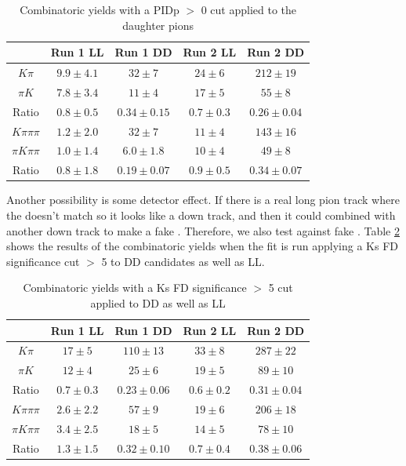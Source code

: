 \begin{table}[!h]
\centering
\begin{tabular}{c|cccc}
& Run 1 LL & Run 1 DD & Run 2 LL & Run 2 DD \\
\hline
$K\pi$ & $9.9 \pm 4.1$ & $32 \pm 7$ & $24 \pm 6$ & $212 \pm 19$ \\
$\pi K$ & $7.8 \pm 3.4$ & $11 \pm 4$ & $17 \pm 5$ & $55 \pm 8$ \\
\hline
Ratio & $0.8 \pm 0.5$ & $0.34 \pm 0.15$ & $0.7 \pm 0.3$ & $0.26 \pm 0.04$ \\
\hline
$K\pi\pi\pi$ & $1.2 \pm 2.0$ & $32 \pm 7$ & $11 \pm 4$ & $143 \pm 16$ \\
$\pi K\pi\pi$ & $1.0 \pm 1.4$ & $6.0 \pm 1.8$ & $10 \pm 4$ & $49 \pm 8$ \\
\hline
Ratio & $0.8 \pm 1.8$ & $0.19 \pm 0.07$ & $0.9 \pm 0.5$ & $0.34 \pm 0.07$ \\
\hline
\end{tabular}
\caption{Combinatoric yields with a PIDp $>$ 0 cut applied to the \KS daughter pions}
\label{combyieldspidp}
\end{table}

Another possibility is some detector effect. If there is a real long pion track where the \velo doesn't match so it looks like a down track, and then it could combined with another down track to make a fake \KS. Therefore, we also test against fake \KS. Table \ref{fakeks} shows the results of the combinatoric yields when the fit is run applying a Ks FD significance cut $>$ 5 to DD candidates as well as LL. 

\begin{table}[!h]
\centering
\begin{tabular}{c|cccc}
& Run 1 LL & Run 1 DD & Run 2 LL & Run 2 DD \\
\hline
$K\pi$ & $17 \pm 5$ & $110 \pm 13$ & $33 \pm 8$ & $287 \pm 22$ \\
$\pi K$ & $12 \pm 4$ & $25 \pm 6$ & $19 \pm 5$ & $89 \pm 10$ \\
\hline
Ratio & $0.7 \pm 0.3$ & $0.23 \pm 0.06$ & $0.6 \pm 0.2$ & $0.31 \pm 0.04$ \\
\hline
$K\pi\pi\pi$ & $2.6 \pm 2.2$ & $57 \pm 9$ & $19 \pm 6$ & $206 \pm 18$ \\
$\pi K\pi\pi$ & $3.4 \pm 2.5$ & $18 \pm 5$ & $14 \pm 5$ & $78 \pm 10$ \\
\hline
Ratio & $1.3 \pm 1.5$ & $0.32 \pm 0.10$ & $0.7 \pm 0.4$ & $0.38 \pm 0.06$ \\
\hline
\end{tabular}
\caption{Combinatoric yields with a Ks FD significance $>$ 5 cut applied to DD as well as LL}
\label{fakeks}
\end{table}

